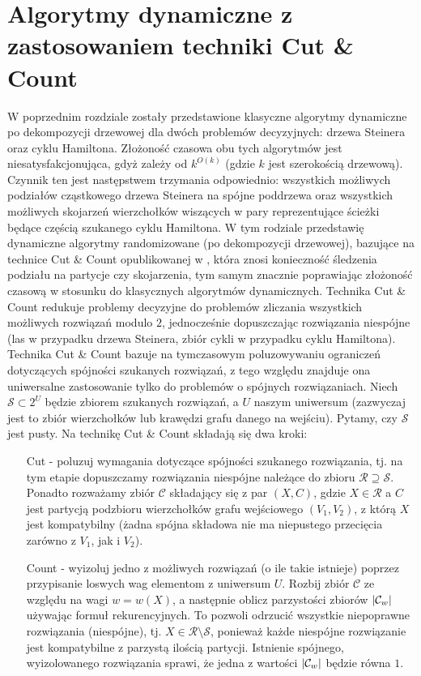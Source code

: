 \documentclass[12pt, oneside]{report}
\newcommand\Omicron{O}
\begin{document}
\newpage
  	\chapter{Algorytmy dynamiczne z zastosowaniem techniki Cut \& Count}

W poprzednim rozdziale zostały przedstawione klasyczne algorytmy dynamiczne po dekompozycji drzewowej dla dwóch problemów decyzyjnych: drzewa Steinera oraz cyklu Hamiltona. Złożoność czasowa obu tych algorytmów jest niesatysfakcjonująca, gdyż zależy od $k^{\Omicron{(k)}}$ (gdzie $k$ jest szerokością drzewową). Czynnik ten jest następstwem trzymania odpowiednio: wszystkich możliwych podziałów cząstkowego drzewa Steinera na spójne poddrzewa oraz wszystkich możliwych skojarzeń wierzchołków wiszących w pary reprezentujące ścieżki będące częścią szukanego cyklu Hamiltona. W tym rodziale przedstawię dynamiczne algorytmy randomizowane (po dekompozycji drzewowej), bazujące na technice Cut \& Count opublikowanej w \cite{parametrized_algorithms}, która znosi konieczność śledzenia podziału na partycje czy skojarzenia, tym samym znacznie poprawiając złożoność czasową w stosunku do klasycznych algorytmów dynamicznych. Technika Cut \& Count redukuje problemy decyzyjne do problemów zliczania wszystkich możliwych rozwiązań modulo $2$, jednocześnie dopuszczając rozwiązania niespójne (las w przypadku drzewa Steinera, zbiór cykli w przypadku cyklu Hamiltona). Technika Cut \& Count bazuje na tymczasowym poluzowywaniu ograniczeń dotyczących spójności szukanych rozwiązań, z tego względu znajduje ona uniwersalne zastosowanie tylko do problemów o spójnych rozwiązaniach. Niech $\mathcal{S} \subset 2^U$ będzie zbiorem szukanych rozwiązań, a $U$ naszym uniwersum (zazwyczaj jest to zbiór wierzchołków lub krawędzi grafu danego na wejściu). Pytamy, czy $\mathcal{S}$ jest pusty. Na technikę Cut \& Count składają się dwa kroki:

\begin{enumerate}

\item[Cut] - poluzuj wymagania dotyczące spójności szukanego rozwiązania, tj. na tym etapie dopuszczamy rozwiązania niespójne należące do zbioru $\mathcal{R} \supseteq \mathcal{S}$. Ponadto rozważamy zbiór $\mathcal{C}$ składający się z par $(X, C)$, gdzie $X \in \mathcal{R}$ a $C$ jest partycją podzbioru wierzchołków grafu wejściowego $(V_1, V_2)$, z którą $X$ jest kompatybilny (żadna spójna składowa nie ma niepustego przecięcia zarówno z $V_1$, jak i $V_2$).  

\item[Count] - wyizoluj jedno z możliwych rozwiązań (o ile takie istnieje) poprzez przypisanie loswych wag elementom z uniwersum $U$. Rozbij zbiór $\mathcal{C}$ ze względu na wagi $w = w(X)$, a następnie oblicz parzystości zbiorów $\abs{\mathcal{C}_w}$ używając formuł rekurencyjnych. To pozwoli odrzucić wszystkie niepoprawne rozwiązania (niespójne), tj. $X \in \mathcal{R} \setminus \mathcal{S}$, ponieważ każde niespójne rozwiązanie jest kompatybilne z parzystą ilością partycji. Istnienie spójnego, wyizolowanego rozwiązania sprawi, że jedna z wartości $\abs{\mathcal{C}_w}$ będzie równa $1$.

\end{enumerate}
\end{document}
